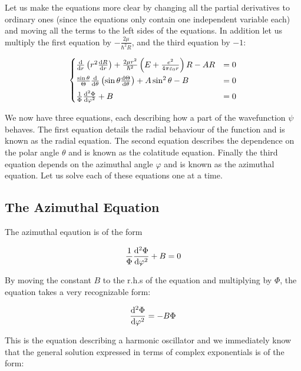 \documentclass{article}
\begin{document}
    Let us make the equations more clear by changing all the partial derivatives to ordinary ones (since the equations only contain one independent variable each) and moving all the terms to the left sides of the
    equations. In addition let us multiply the first equation by $-\frac{2\mu}{\hbar^2R}$, and the third equation by $-1$:

    \begin{equation}
        \begin{cases}
            \odv{}{r}\left( r^2\odv{R}{r} \right) + \frac{2\mu r^2}{\hbar^2}\left( E + \frac{e^2}{4\pi\varepsilon_{0}r} \right)R - AR &= 0 \\[0.5em]
            \frac{\sin\theta}{\Theta}\odv{}{\theta}\left( \sin\theta\odv{\Theta}{\theta} \right) + A\sin^2\theta - B &= 0 \\[0.5em]
            \frac{1}{\Phi}\odv[order = 2]{\Phi}{\varphi} + B &= 0
        \end{cases}
    \end{equation}

    We now have three equations, each describing how a part of the wavefunction $\psi$ behaves. The first equation details the radial behaviour of the function and is known as the radial equation. The
    second equation describes the dependence on the polar angle $\theta$ and is known as the colatitude equation. Finally the third equation depends on the azimuthal angle $\varphi$ and is known as the
    azimuthal equation. Let us solve each of these equations one at a time.

    \subsection{The Azimuthal Equation}

    The azimuthal eqaution is of the form

    \begin{equation}
        \frac{1}{\Phi}\odv[order = 2]{\Phi}{\varphi} + B = 0
    \end{equation}

    By moving the constant $B$ to the r.h.s of the equation and multiplying by $\Phi$, the equation
    takes a very recognizable form:

    \begin{equation}
        \odv[order = 2]{\Phi}{\varphi} = -B\Phi
    \end{equation}

    This is the equation describing a harmonic oscillator and we immediately know that the general solution
    expressed in terms of complex exponentials is of the form:
\end{document}
